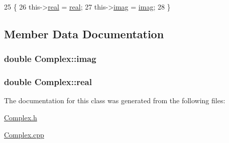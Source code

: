 \begin{DoxyCode}
25                                                \{
26    this->\hyperlink{classComplex_a0138f5fe2b2c6180b8fcda77a7aa51c5}{real} = \hyperlink{classComplex_a0138f5fe2b2c6180b8fcda77a7aa51c5}{real};
27    this->\hyperlink{classComplex_a2bb90cc563599c3c8bdec9acf9ea40a6}{imag} = \hyperlink{classComplex_a2bb90cc563599c3c8bdec9acf9ea40a6}{imag};
28 \}
\end{DoxyCode}


\subsection{Member Data Documentation}
\subsubsection[{\texorpdfstring{imag}{imag}}]{\setlength{\rightskip}{0pt plus 5cm}double Complex\+::imag\hspace{0.3cm}{\ttfamily [private]}}\hypertarget{classComplex_a2bb90cc563599c3c8bdec9acf9ea40a6}{}\label{classComplex_a2bb90cc563599c3c8bdec9acf9ea40a6}
\subsubsection[{\texorpdfstring{real}{real}}]{\setlength{\rightskip}{0pt plus 5cm}double Complex\+::real\hspace{0.3cm}{\ttfamily [private]}}\hypertarget{classComplex_a0138f5fe2b2c6180b8fcda77a7aa51c5}{}\label{classComplex_a0138f5fe2b2c6180b8fcda77a7aa51c5}


The documentation for this class was generated from the following files\+:\begin{DoxyCompactItemize}
\item 
\hyperlink{Complex_8h}{Complex.\+h}\item 
\hyperlink{Complex_8cpp}{Complex.\+cpp}\end{DoxyCompactItemize}
